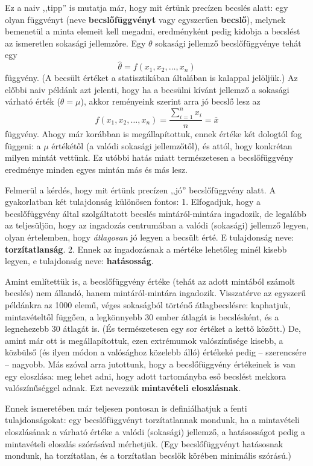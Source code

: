 \documentclass[]{book}
\begin{document}
Ez a naiv ,,tipp'' is mutatja már, hogy mit értünk precízen becslés
alatt: egy olyan függvényt (neve \textbf{becslőfüggvényt} vagy
egyszerűen \textbf{becslő}), melynek bemenetül a minta elemeit kell
megadni, eredményként pedig kidobja a becslést az ismeretlen sokasági
jellemzőre. Egy \(\theta\) sokasági jellemző becslőfüggvénye tehát egy
\[
    \widehat{\theta} = f\left(x_1,x_2,\ldots,x_n\right)
\] függvény. (A becsült értéket a statisztikában általában is kalappal
jelöljük.) Az előbbi naiv példánk azt jelenti, hogy ha a becsülni kívánt
jellemző a sokasági várható érték (\(\theta=\mu\)), akkor reményeink
szerint arra jó becslő lesz az \[
    f\left(x_1,x_2,\ldots,x_n\right)=\frac{\sum_{i=1}^n x_i}{n}=\overline{x}
\] függvény. Ahogy már korábban is megállapítottuk, ennek értéke két
dologtól fog függeni: a \(\mu\) értékétől (a valódi sokasági
jellemzőtől), és attól, hogy konkrétan milyen mintát vettünk. Ez utóbbi
hatás miatt természetesen a becslőfüggvény eredménye minden egyes mintán
más és más lesz.

Felmerül a kérdés, hogy mit értünk precízen ,,jó'' becslőfüggvény alatt.
A gyakorlatban két tulajdonság különösen fontos: 1. Elfogadjuk, hogy a
becslőfüggvény által szolgáltatott becslés mintáról-mintára ingadozik,
de legalább az teljesüljön, hogy az ingadozás centrumában a valódi
(sokasági) jellemző legyen, olyan értelemben, hogy \emph{átlagosan} jó
legyen a becsült érté. E tulajdonság neve: \textbf{torzítatlanság}. 2.
Ennek az ingadozásnak a mértéke lehetőleg minél kisebb legyen, e
tulajdonság neve: \textbf{hatásosság}.

Amint említettük is, a becslőfüggvény értéke (tehát az adott mintából
számolt becslés) nem állandó, hanem mintáról-mintára ingadozik.
Visszatérve az egyszerű példánkra az 1000 elemű, véges sokaságból
történő átlagbecslésre: kaphatjuk, mintavételtől függően, a legkönnyebb
30 ember átlagát is becslésként, és a legnehezebb 30 átlagát is. (És
természetesen egy sor értéket a kettő között.) De, amint már ott is
megállapítottuk, ezen extrémumok valószínűsége kisebb, a közbülső (és
ilyen módon a valósághoz közelebb álló) értékeké pedig -- szerencsére --
nagyobb. Más szóval arra jutottunk, hogy a becslőfüggvény értékeinek is
van egy eloszlása: meg lehet adni, hogy adott tartományba eső becslést
mekkora valószínűséggel adnak. Ezt nevezzük \textbf{mintavételi
eloszlásnak}.

Ennek ismeretében már teljesen pontosan is definiálhatjuk a fenti
tulajdonságokat: egy becslőfüggvényt torzítatlannak mondunk, ha a
mintavételi eloszlásának a várható értéke a valódi (sokasági) jellemző,
a hatásosságot pedig a mintavételi eloszlás szórásával mérhetjük. (Egy
becslőfüggvényt hatásosnak mondunk, ha torzítatlan, és a torzítatlan
becslők körében minimális szórású.)
\end{document}
